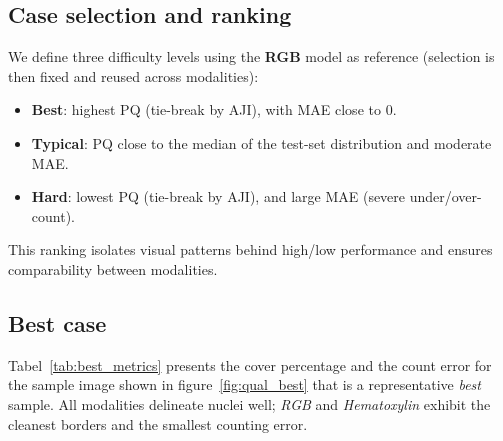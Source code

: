 \documentclass[target=bach,aauheader=,style=]{thud}
\begin{document}
\subsection{Case selection and ranking}
We define three difficulty levels using the \textbf{RGB} model as reference (selection is then fixed and reused across modalities):
\begin{itemize}
  \item \textbf{Best}: highest PQ (tie-break by AJI), with MAE close to $0$.
  \item \textbf{Typical}: PQ close to the median of the test-set distribution and moderate MAE.
  \item \textbf{Hard}: lowest PQ (tie-break by AJI), and large MAE (severe under/over-count).
\end{itemize}
This ranking isolates visual patterns behind high/low performance and ensures comparability between modalities.


\subsection{Best case}
Tabel~\ref{tab:best_metrics} presents the cover percentage and the count error for the sample image shown in figure~\ref{fig:qual_best} that is a representative \emph{best} sample. All modalities delineate nuclei well; \emph{RGB} and \emph{Hematoxylin} exhibit the cleanest borders and the smallest counting error.
\end{document}
